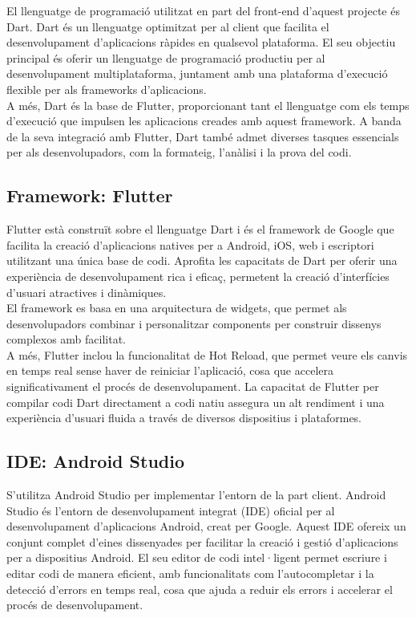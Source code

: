 \documentclass[a4paper,12pt,twoside]{ThesisStyle}
\begin{document}
El llenguatge de programació utilitzat en part del front-end d’aquest projecte és Dart. Dart és un llenguatge optimitzat per al client que facilita el desenvolupament d'aplicacions ràpides en qualsevol plataforma. El seu objectiu principal és oferir un llenguatge de programació productiu per al desenvolupament multiplataforma, juntament amb una plataforma d’execució flexible per als frameworks d'aplicacions.\\

A més, Dart és la base de Flutter, proporcionant tant el llenguatge com els temps d'execució que impulsen les aplicacions creades amb aquest framework. A banda de la seva integració amb Flutter, Dart també admet diverses tasques essencials per als desenvolupadors, com la formateig, l’anàlisi i la prova del codi.

\subsection{Framework: Flutter}
\label{subsec:Framework: Flutter}


Flutter està construït sobre el llenguatge Dart i és el framework de Google que facilita la creació d’aplicacions natives per a Android, iOS, web i escriptori utilitzant una única base de codi. Aprofita les capacitats de Dart per oferir una experiència de desenvolupament rica i eficaç, permetent la creació d'interfícies d'usuari atractives i dinàmiques.\\

El framework es basa en una arquitectura de widgets, que permet als desenvolupadors combinar i personalitzar components per construir dissenys complexos amb facilitat.\\

A més, Flutter inclou la funcionalitat de Hot Reload, que permet veure els canvis en temps real sense haver de reiniciar l'aplicació, cosa que accelera significativament el procés de desenvolupament. La capacitat de Flutter per compilar codi Dart directament a codi natiu assegura un alt rendiment i una experiència d'usuari fluida a través de diversos dispositius i plataformes.


\subsection{IDE: Android Studio}
\label{subsec:IDE: Android Studio}

S’utilitza Android Studio per implementar l’entorn de la part client. Android Studio és l’entorn de desenvolupament integrat (IDE) oficial per al desenvolupament d’aplicacions Android, creat per Google. Aquest IDE ofereix un conjunt complet d’eines dissenyades per facilitar la creació i gestió d’aplicacions per a dispositius Android. El seu editor de codi intel·ligent permet escriure i editar codi de manera eficient, amb funcionalitats com l’autocompletar i la detecció d’errors en temps real, cosa que ajuda a reduir els errors i accelerar el procés de desenvolupament.\\
\end{document}
